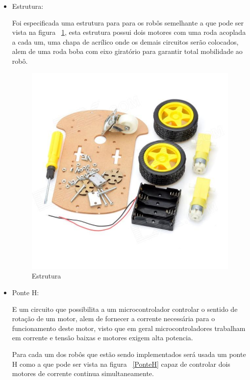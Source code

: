 \documentclass{abnt}
\begin{document}
\begin{itemize}

     \item Estrutura: 

        Foi especificada uma estrutura para para os robôs semelhante a que pode ser
        vista na figura ~\ref{Estrutura}, esta estrutura possui dois motores
        com uma roda acoplada a cada um, uma chapa de acrílico onde os demais
        circuitos serão colocados, alem de uma roda boba com eixo giratório
        para garantir total mobilidade ao robô. 

         \begin{figure}[ht!]
             \centering
             \includegraphics[scale=0.3]{Estrutura.jpg}
             \caption{Estrutura \label{Estrutura}}
         \end{figure}

     \item Ponte H:

        E um circuito que possibilita a um microcontrolador controlar o sentido
        de rotação de um motor, alem de fornecer a corrente necessária para o
        funcionamento deste motor, visto que em geral microcontroladores
        trabalham em corrente e tensão baixas e motores exigem alta potencia.

        Para cada um dos robôs que estão sendo implementados será usada um
        ponte H como a que pode ser vista na figura ~\ref{PonteH} capaz de
        controlar dois motores de corrente continua simultaneamente. 


\end{itemize}
\end{document}
